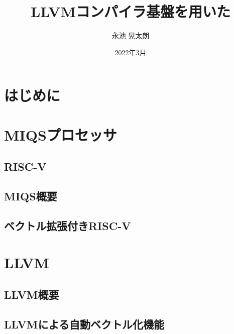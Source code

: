 \documentclass[a4paper,11pt,fleqn]{jbook}
\title{LLVMコンパイラ基盤を用いた}
\author{永池 晃太朗}
\date{2022年3月}
\begin{document}
\maketitle

\begin{jabstract}

\end{jabstract}

\begin{abstract}
\end{abstract}

\newpage
\tableofcontents    %


\newpage
\chapter{はじめに}
\label{chp:intro}   %



\newpage
\chapter{MIQSプロセッサ}
\label{chp:2}


\section{RISC-V}
\label{chp:2_1}

\section{MIQS概要}
\label{chp:2_2}

\section{ベクトル拡張付きRISC-V}
\label{chp:2_3}



\newpage
\chapter{LLVM}
\label{chp:3}

\section{LLVM概要}
\label{chp:3_1}

\section{LLVMによる自動ベクトル化機能}
\label{chp:3_2}

\end{document}
